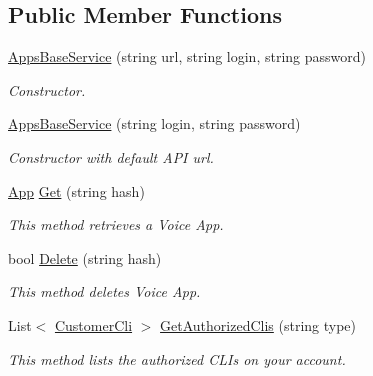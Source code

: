 \subsection*{Public Member Functions}
\begin{DoxyCompactItemize}
\item 
\hyperlink{class_thecallr_api_1_1_services_1_1_client_1_1_apps_base_service_a39351754f1f49516bf45ad82621112e4}{Apps\+Base\+Service} (string url, string login, string password)
\begin{DoxyCompactList}\small\item\em Constructor. \end{DoxyCompactList}\item 
\hyperlink{class_thecallr_api_1_1_services_1_1_client_1_1_apps_base_service_a161cbc874b775a592fdfedd1903d353e}{Apps\+Base\+Service} (string login, string password)
\begin{DoxyCompactList}\small\item\em Constructor with default A\+P\+I url. \end{DoxyCompactList}\item 
\hyperlink{class_thecallr_api_1_1_objects_1_1_app_1_1_app}{App} \hyperlink{class_thecallr_api_1_1_services_1_1_client_1_1_apps_base_service_a16eb4a94326a3092236c599d8c5445d2}{Get} (string hash)
\begin{DoxyCompactList}\small\item\em This method retrieves a Voice App. \end{DoxyCompactList}\item 
bool \hyperlink{class_thecallr_api_1_1_services_1_1_client_1_1_apps_base_service_af50747d346b92754ffb83f17970dfda8}{Delete} (string hash)
\begin{DoxyCompactList}\small\item\em This method deletes Voice App. \end{DoxyCompactList}\item 
List$<$ \hyperlink{class_thecallr_api_1_1_objects_1_1_misc_1_1_customer_cli}{Customer\+Cli} $>$ \hyperlink{class_thecallr_api_1_1_services_1_1_client_1_1_apps_base_service_af6caca8bc3d8db1bd4fe6f627dde7d8d}{Get\+Authorized\+Clis} (string type)
\begin{DoxyCompactList}\small\item\em This method lists the authorized C\+L\+Is on your account. \end{DoxyCompactList}\end{DoxyCompactItemize}

